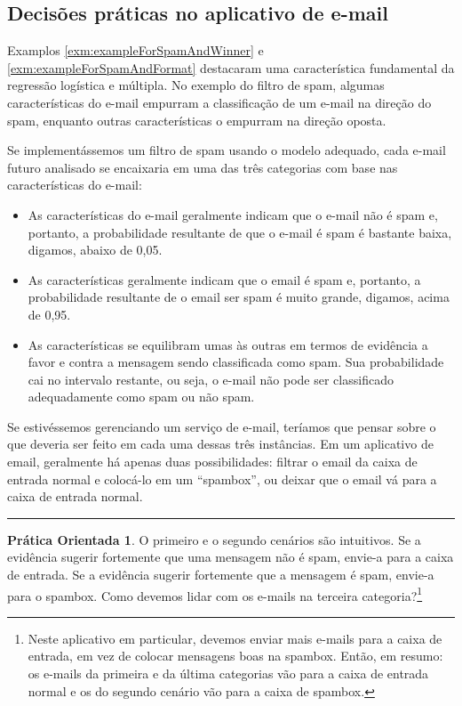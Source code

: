 \documentclass[
]{book}
\theoremstyle{definition}
\theoremstyle{definition}
\theoremstyle{definition}
\newtheorem{exercise}{Prática Orientada}[chapter]
\theoremstyle{definition}
\theoremstyle{remark}
\begin{document}
\hypertarget{practicalDecisionsOnEMailApp}{%
\subsection{Decisões práticas no aplicativo de e-mail}\label{practicalDecisionsOnEMailApp}}

Examplos \ref{exm:exampleForSpamAndWinner} e \ref{exm:exampleForSpamAndFormat} destacaram uma característica fundamental da regressão logística e múltipla. No exemplo do filtro de spam, algumas características do e-mail empurram a classificação de um e-mail na direção do spam, enquanto outras características o empurram na direção oposta.

Se implementássemos um filtro de spam usando o modelo adequado, cada e-mail futuro analisado se encaixaria em uma das três categorias com base nas características do e-mail:

\begin{itemize}
\item
  As características do e-mail geralmente indicam que o e-mail não é spam e, portanto, a probabilidade resultante de que o e-mail é spam é bastante baixa, digamos, abaixo de 0,05.
\item
  As características geralmente indicam que o email é spam e, portanto, a probabilidade resultante de o email ser spam é muito grande, digamos, acima de 0,95.
\item
  As características se equilibram umas às outras em termos de evidência a favor e contra a mensagem sendo classificada como spam. Sua probabilidade cai no intervalo restante, ou seja, o e-mail não pode ser classificado adequadamente como spam ou não spam.
\end{itemize}

Se estivéssemos gerenciando um serviço de e-mail, teríamos que pensar sobre o que deveria ser feito em cada uma dessas três instâncias. Em um aplicativo de email, geralmente há apenas duas possibilidades: filtrar o email da caixa de entrada normal e colocá-lo em um ``spambox'', ou deixar que o email vá para a caixa de entrada normal.

\begin{center}\rule{0.5\linewidth}{0.5pt}\end{center}

\begin{exercise}
\protect\hypertarget{exr:unnamed-chunk-299}{}{\label{exr:unnamed-chunk-299} }O primeiro e o segundo cenários são intuitivos. Se a evidência sugerir fortemente que uma mensagem não é spam, envie-a para a caixa de entrada. Se a evidência sugerir fortemente que a mensagem é spam, envie-a para o spambox. Como devemos lidar com os e-mails na terceira categoria?\footnote{Neste aplicativo em particular, devemos enviar mais e-mails para a caixa de entrada, em vez de colocar mensagens boas na spambox. Então, em resumo: os e-mails da primeira e da última categorias vão para a caixa de entrada normal e os do segundo cenário vão para a caixa de spambox.}
\end{exercise}
\end{document}
